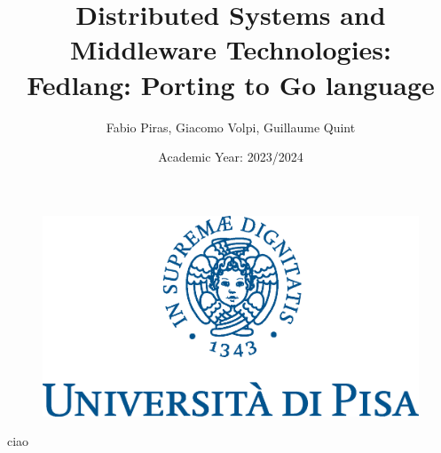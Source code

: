 \documentclass[a4paper, openright]{report}
\author{Fabio Piras, Giacomo Volpi, Guillaume Quint}
\title{Distributed Systems and Middleware Technologies:\\
Fedlang: Porting to Go language}
\date{Academic Year: 2023/2024}
\begin{document}
\begin{figure}
\centering

\includegraphics[scale=0.75]{./images/cherubino}

\end{figure}
\maketitle
\thispagestyle{empty}
\newpage

\tableofcontents


\thispagestyle{empty}


ciao


\end{document}
